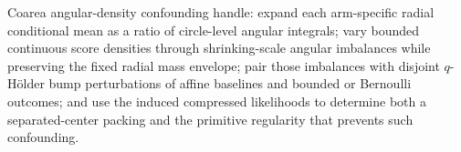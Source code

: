 Coarea angular-density confounding handle: expand each arm-specific radial conditional mean as a ratio of circle-level angular integrals; vary bounded continuous score densities through shrinking-scale angular imbalances while preserving the fixed radial mass envelope; pair those imbalances with disjoint \(q\)-H\"older bump perturbations of affine baselines and bounded or Bernoulli outcomes; and use the induced compressed likelihoods to determine both a separated-center packing and the primitive regularity that prevents such confounding.